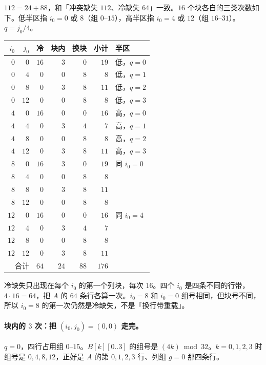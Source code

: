 $112=24+88$，和「冲突缺失 $112$、冷缺失 $64$」一致。$16$ 个块各自的三类次数如下。低半区指 $i_0=0$ 或 $8$（组 $0$--$15$），高半区指 $i_0=4$ 或 $12$（组 $16$--$31$）。$q=j_0/4$。

\begin{center}
\label{tab:c1tiles}
\small
\begin{tabular}{@{}rrrrrrl@{}}
\toprule
$i_0$ & $j_0$ & 冷 & 块内 & 换块 & 小计 & 半区\\
\midrule
$0$ & $0$ & $16$ & $3$ & $0$ & $19$ & 低，$q=0$\\
$0$ & $4$ & $0$ & $0$ & $8$ & $8$ & 低，$q=1$\\
$0$ & $8$ & $0$ & $3$ & $8$ & $11$ & 低，$q=2$\\
$0$ & $12$ & $0$ & $0$ & $8$ & $8$ & 低，$q=3$\\
$4$ & $0$ & $16$ & $0$ & $0$ & $16$ & 高，$q=0$\\
$4$ & $4$ & $0$ & $3$ & $4$ & $7$ & 高，$q=1$\\
$4$ & $8$ & $0$ & $0$ & $8$ & $8$ & 高，$q=2$\\
$4$ & $12$ & $0$ & $3$ & $8$ & $11$ & 高，$q=3$\\
$8$ & $0$ & $16$ & $3$ & $0$ & $19$ & 同 $i_0=0$\\
$8$ & $4$ & $0$ & $0$ & $8$ & $8$ & \\
$8$ & $8$ & $0$ & $3$ & $8$ & $11$ & \\
$8$ & $12$ & $0$ & $0$ & $8$ & $8$ & \\
$12$ & $0$ & $16$ & $0$ & $0$ & $16$ & 同 $i_0=4$\\
$12$ & $4$ & $0$ & $3$ & $4$ & $7$ & \\
$12$ & $8$ & $0$ & $0$ & $8$ & $8$ & \\
$12$ & $12$ & $0$ & $3$ & $8$ & $11$ & \\
\midrule
\multicolumn{2}{r}{合计} & $64$ & $24$ & $88$ & $176$ & \\
\bottomrule
\end{tabular}
\end{center}

冷缺失只出现在每个 $i_0$ 的第一个列块，每次 $16$。四个 $i_0$ 是四条不同的行带，$4\cdot16=64$，把 $A$ 的 $64$ 条行各算一次。$i_0=8$ 和 $i_0=0$ 组号相同，但块号不同，所以 $i_0=8$ 的第一次仍然是冷缺失，不是「换行带重载」。

\paragraph{块内的 $3$ 次：把 \texorpdfstring{$(i_0,j_0)=(0,0)$}{(0,0)} 走完。}
$q=0$，四行占用组 $0$--$15$。$B[k][0..3]$ 的组号是 $(4k)\bmod 32$。$k=0,1,2,3$ 时组号是 $0,4,8,12$，正好是 $A$ 的第 $0,1,2,3$ 行、列组 $g=0$ 那四条行。

